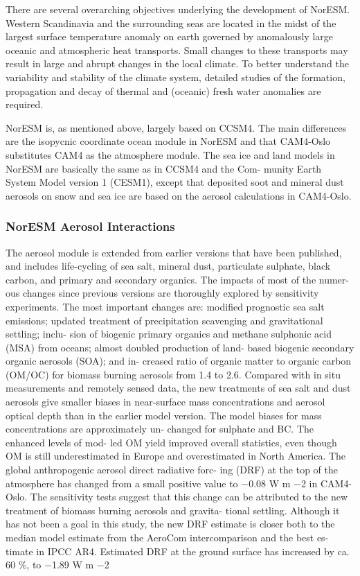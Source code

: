 \documentclass[
]{book}
\begin{document}
There are several overarching objectives underlying the
development of NorESM. Western Scandinavia and the surrounding
seas are located in the midst of the largest surface
temperature anomaly on earth governed
by anomalously large oceanic and atmospheric heat
transports.
Small changes to these transports may result in large and abrupt changes in the local climate.
To better understand the variability and stability of the climate system,
detailed studies of the formation, propagation
and decay of thermal and (oceanic) fresh water anomalies are required.

NorESM is, as mentioned above, largely based on CCSM4.
The main differences are the isopycnic coordinate ocean
module in NorESM and that CAM4-Oslo substitutes CAM4
as the atmosphere module. The sea ice and land models in
NorESM are basically the same as in CCSM4 and the Com-
munity Earth System Model version 1 (CESM1), except that
deposited soot and mineral dust aerosols on snow and sea ice
are based on the aerosol calculations in CAM4-Oslo.

\hypertarget{noresm-aerosol-interactions}{%
\subsubsection{NorESM Aerosol Interactions}\label{noresm-aerosol-interactions}}

The aerosol module is extended from earlier versions that
have been published, and includes life-cycling of sea salt,
mineral dust, particulate sulphate, black carbon, and primary
and secondary organics. The impacts of most of the numer-
ous changes since previous versions are thoroughly explored
by sensitivity experiments. The most important changes are:
modified prognostic sea salt emissions; updated treatment
of precipitation scavenging and gravitational settling; inclu-
sion of biogenic primary organics and methane sulphonic
acid (MSA) from oceans; almost doubled production of land-
based biogenic secondary organic aerosols (SOA); and in-
creased ratio of organic matter to organic carbon (OM/OC)
for biomass burning aerosols from 1.4 to 2.6.
Compared with in situ measurements and remotely sensed
data, the new treatments of sea salt and dust aerosols
give smaller biases in near-surface mass concentrations and
aerosol optical depth than in the earlier model version. The
model biases for mass concentrations are approximately un-
changed for sulphate and BC. The enhanced levels of mod-
led OM yield improved overall statistics, even though OM
is still underestimated in Europe and overestimated in North
America.
The global anthropogenic aerosol direct radiative forc-
ing (DRF) at the top of the atmosphere has changed from
a small positive value to −0.08 W m −2 in CAM4-Oslo. The
sensitivity tests suggest that this change can be attributed to
the new treatment of biomass burning aerosols and gravita-
tional settling. Although it has not been a goal in this study,
the new DRF estimate is closer both to the median model
estimate from the AeroCom intercomparison and the best es-
timate in IPCC AR4. Estimated DRF at the ground surface
has increased by ca. 60 \%, to −1.89 W m −2
\end{document}
